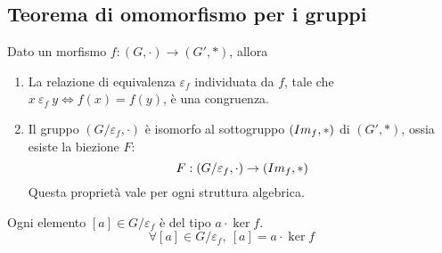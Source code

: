 
\subsection{Teorema di omomorfismo per i gruppi}

\begin{theorem}
Dato un morfismo $f : (G, \cdot) \to (G', \ast)$, allora 
\begin{enumerate}
    \item La relazione di equivalenza $\varepsilon_f$ individuata da $f$, tale che $x \ \varepsilon_f \ y \iff f(x) = f(y)$, \`e una congruenza.
    \item Il gruppo $(G / \varepsilon_f, \cdot)$ \`e isomorfo al sottogruppo $(Im_{f}, \ast)$ di $(G', \ast)$, ossia esiste la biezione $F$:
    \[
    F : (G / \varepsilon_f, \cdot) \to (Im_{f}, \ast)
    \]
    Questa propriet\`a vale per ogni struttura algebrica.
\end{enumerate}
Ogni elemento $[a] \in G / \varepsilon_f$ \`e del tipo $a \cdot \ker f$.
\[
\forall [a] \in G / \varepsilon_f , \ [a] = a \cdot \ker f
\]
\end{theorem}

